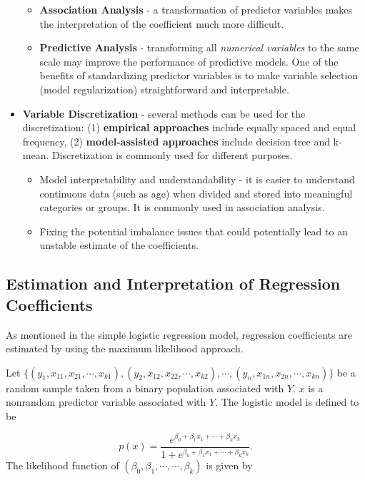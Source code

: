 \documentclass[
]{book}
\begin{document}
\begin{itemize}
  \begin{itemize}
  \item
    \textbf{Association Analysis} - a transformation of predictor variables makes the interpretation of the coefficient much more difficult.
  \item
    \textbf{Predictive Analysis} - transforming all \emph{numerical variables} to the same scale may improve the performance of predictive models. One of the benefits of standardizing predictor variables is to make variable selection (model regularization) straightforward and interpretable.
  \end{itemize}
\item
  \textbf{Variable Discretization} - several methods can be used for the discretization: (1) \textbf{empirical approaches} include equally spaced and equal frequency, (2) \textbf{model-assisted approaches} include decision tree and k-mean. Discretization is commonly used for different purposes.

  \begin{itemize}
  \item
    Model interpretability and understandability - it is easier to understand continuous data (such as age) when divided and stored into meaningful categories or groups. It is commonly used in association analysis.
  \item
    Fixing the potential imbalance issues that could potentially lead to an unstable estimate of the coefficients.
  \end{itemize}
\end{itemize}

\hypertarget{estimation-and-interpretation-of-regression-coefficients}{%
\subsection{Estimation and Interpretation of Regression Coefficients}\label{estimation-and-interpretation-of-regression-coefficients}}

As mentioned in the simple logistic regression model, regression coefficients are estimated by using the maximum likelihood approach.

Let \(\{(y_1, x_{11}, x_{21}, \cdots, x_{k1}), (y_2, x_{12}, x_{22}, \cdots, x_{k2}), \cdots, (y_n, x_{1n}, x_{2n}, \cdots, x_{kn})\}\) be a random sample taken from a binary population associated with \(Y\). \(x\) is a nonrandom predictor variable associated with \(Y\). The logistic model is defined to be

\[
p(x) = \frac{e^{\beta_0 + \beta_1 x_1 +\cdots + \beta_kx_k}}{1 + e^{\beta_0 + \beta_1 x_1 + \cdots + \beta_kx_k}}.
\]
The likelihood function of \((\beta_0, \beta_1, \cdots, \cdots, \beta_k)\) is given by
\end{document}

